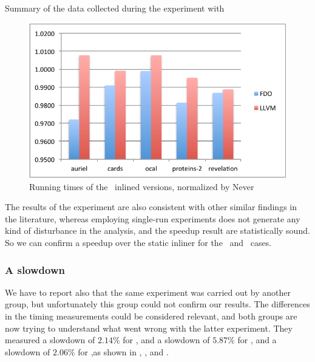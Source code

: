 \begin{table}
  \centering
  \begin{tiny}
  
  \end{tiny}
  \caption{Summary of the data collected during the experiment with \gzip}
  \label{tab:speedupz}
\end{table}

\begin{figure}
  \centering
  \includegraphics[width=1.00\linewidth]{Figures/speedup}
  \caption{Running times of the \gzip\ inlined versions, normalized by Never}
  \label{fig:speedupz}
\end{figure}

The results of the experiment are also consistent with other similar findings in the literature, whereas employing single-run experiments does not generate any kind of disturbance in the analysis, and the speedup result are statistically sound. So we can confirm a speedup over the static inliner for the \bzip\ and \gzip\ cases.

\subsubsection{A slowdown}
\label{sec:slowdown}

We have to report also that the same experiment was carried out by another group, but unfortunately this group could not confirm our results. The differences in the timing measurements could be considered relevant, and both groups are now trying to understand what went wrong with the latter experiment. They measured a slowdown of $2.14 \%$ for \bzip, and a slowdown of $5.87 \%$ for \gzip, and a slowdown of $2.06 \%$ for \gcc,as shown in , , and .

